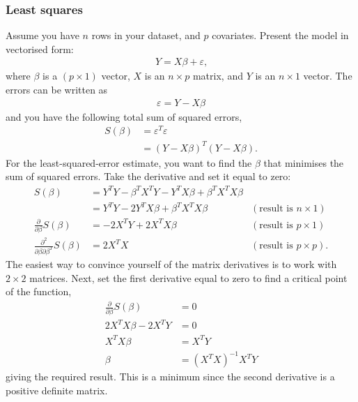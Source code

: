 \documentclass[a4paper]{article}
\begin{document}
\subsubsection{Least squares}
Assume you have $n$ rows in your dataset, and $p$ covariates.
Present the model in vectorised form:
\begin{align*}
Y = X \beta + \varepsilon
\text{,}
\end{align*}
where $\beta$ is a $(p \times 1)$ vector,
$X$ is an $n \times p$ matrix, and
$Y$ is an $n \times 1$ vector.
The errors can be written as
\begin{align*}
\varepsilon = Y-X \beta
\end{align*}
and you have the following total sum of squared errors,
\begin{align*}
S(\beta) &= \varepsilon^T \varepsilon \\
&= (Y-X\beta)^T (Y-X\beta)
\text{.}
\end{align*}
For the least-squared-error estimate, you want to find the $\beta$ that minimises the sum of squared errors. Take the derivative and set it equal to zero:
\begin{align*}
  S(\beta)
  &= Y^T Y -\beta^T X^T Y - Y^T X \beta + \beta^T X^T X \beta \\
  &= Y^T Y - 2 Y^T X \beta + \beta^T X^T X \beta
  & (\text{result is }n \times 1)
  \\
 \frac{\partial}{\partial\beta} S(\beta)
 &= - 2 X^T Y +
    2X^T X \beta
    & (\text{result is }p \times 1)
    \\
 \frac{\partial^2}{\partial\beta \partial\beta^T} S(\beta)
 &= 2
    X^T
    X
    & (\text{result is }p \times p)
    \text{.}
\end{align*}
The easiest way to convince yourself of the matrix derivatives is to work with $2 \times 2$ matrices.
Next, set the first derivative equal to zero to find a critical point of the function,
\begin{align*}
 \frac{\partial}{\partial\beta} S(\beta) &= 0 \\
  2X^T X \beta - 2 X^T Y &= 0 \\
  X^T X \beta &=  X^T Y  \\
   \beta &= (X^T X)^{-1} X^T Y
\end{align*}
giving the required result.
This is a minimum since the second derivative is a positive definite matrix.
\end{document}
